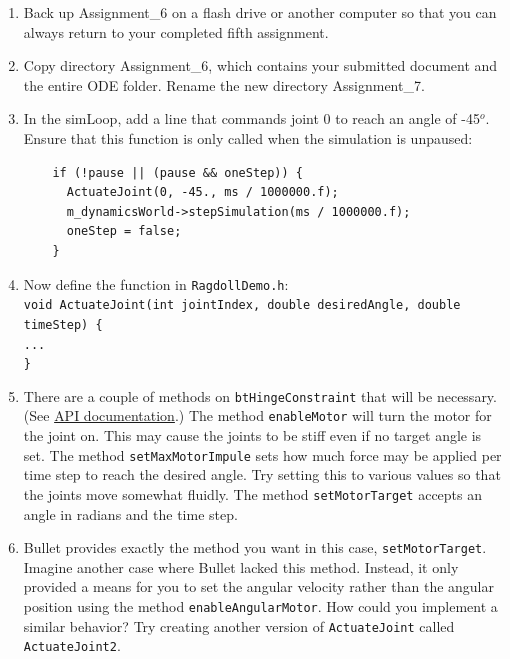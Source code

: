\documentclass[12pt]{article}
\begin{document}
\begin{enumerate}

\item Back up Assignment\_6 on a flash drive or another computer so that you can always return to your completed fifth assignment.

\item Copy directory Assignment\_6, which contains your submitted document and the entire ODE folder. Rename the new directory Assignment\_7.

\item In the simLoop, add a line that commands joint 0 to reach an angle of -45$^o$. Ensure that this function is only called when the simulation is unpaused: 
\begin{verbatim}
    if (!pause || (pause && oneStep)) {
      ActuateJoint(0, -45., ms / 1000000.f);
      m_dynamicsWorld->stepSimulation(ms / 1000000.f);
      oneStep = false;
    }
\end{verbatim}

\item Now define the function in \verb|RagdollDemo.h|: \\
\texttt{void ActuateJoint(int jointIndex, double desiredAngle, double timeStep) \{} \\
\texttt{...} \\
\texttt{\}}

\item There are a couple of methods on \verb|btHingeConstraint| that will be necessary.  (See \href{http://bulletphysics.com/Bullet/BulletFull/classbtHingeConstraint.html}{API documentation}.)  The method \verb|enableMotor| will turn the motor for the joint on.  This may cause the joints to be stiff even if no target angle is set.  The method \verb|setMaxMotorImpule| sets how much force may be applied per time step to reach the desired angle.  Try setting this to various values so that the joints move somewhat fluidly.  The method \verb|setMotorTarget| accepts an angle in radians and the time step.  

\item Bullet provides exactly the method you want in this case, \verb|setMotorTarget|.  Imagine another case where Bullet lacked this method.  Instead, it only provided a means for you to set the angular velocity rather than the angular position using the method \verb|enableAngularMotor|.  How could you implement a similar behavior?  Try creating another version of \verb|ActuateJoint| called \verb|ActuateJoint2|.


\end{enumerate}
\end{document}
